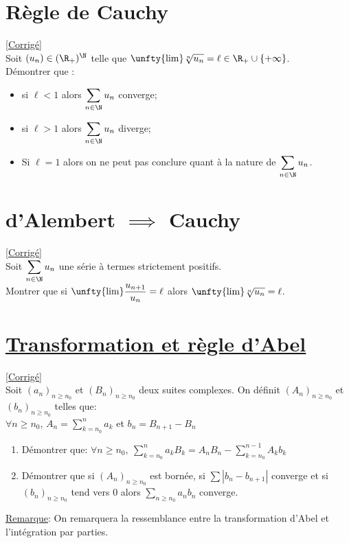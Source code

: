 \documentclass{book}
\begin{document}
	\section{Règle de Cauchy }
	\textcolor{blue}{\hyperref[sec:regle-de-cauchy]{[Corrigé]}}\\
	\label{Règle de Cauchy}
	Soit $(u_n)\in(\R_+)^\N$ telle que $\unfty{\lim}\displaystyle\sqrt[n]{u_n}=\ell\in\R_+\cup\{+\infty\}$.
	\\Démontrer que :
	\begin{itemize}
		\item si $\ell<1$ alors $\displaystyle\sum_{n\in \N} u_n$ converge;
		\item si $\ell>1$ alors $\displaystyle\sum_{n\in \N} u_n$ diverge;
		\item Si $\ell=1$ alors on ne peut pas conclure quant à la nature de $\displaystyle\sum_{n\in \N} u_n$.
	\end{itemize}
	
	\section{d'Alembert $\implies$ Cauchy }
	\textcolor{blue}{\hyperref[sec:dalembert-rightarrow-cauchy]{[Corrigé]}}\\
	\label{d'Alembert implique Cauchy}
	Soit $\displaystyle\sum\limits_{n\in \N} u_n$ une série à termes strictement positifs.
	\\ Montrer que si $\unfty{\lim} \displaystyle\frac{u_{n+1}}{u_n}=\ell$ alors $\unfty{\lim}\sqrt[n]{u_n}=\ell$.
	
	\section{\underline{Transformation et règle d'Abel} }
	\textcolor{blue}{\hyperref[sec:transformation-dabel-et-regle-dabel]{[Corrigé]}}\\
	\label{Transformation et règle d'Abel}
	Soit $(a_n)_{n\geq n_0}$ et $(B_n)_{n\geq n_0}$ deux suites complexes. On définit $(A_n)_{n\geq n_0}$ et $(b_n)_{n\geq n_0}$ telles que: \\$\forall n \geq n_0$, $A_n=\displaystyle\sum\limits_{k=n_0}^na_k$ et $b_n=B_{n+1}-B_n$
	\begin{enumerate}
		\item Démontrer que: $ \forall n\geq n_{0},\ \displaystyle\sum\limits_{k=n_0}^na_kB_k=A_nB_n-\sum\limits_{k=n_0}^{n-1} A_kb_k$
		\item Démontrer que si $(A_n)_{n\geq n_0}$ est bornée, si $\displaystyle\sum|b_n-b_{n+1}|$ converge et si $(b_n)_{n\geq n_0}$ tend vers 0 alors $\displaystyle\sum_{n\geq n_0}a_nb_n$ converge.
	\end{enumerate}
	\underline{Remarque}: On remarquera la ressemblance entre la transformation d'Abel et l'intégration par parties.
	
\end{document}
